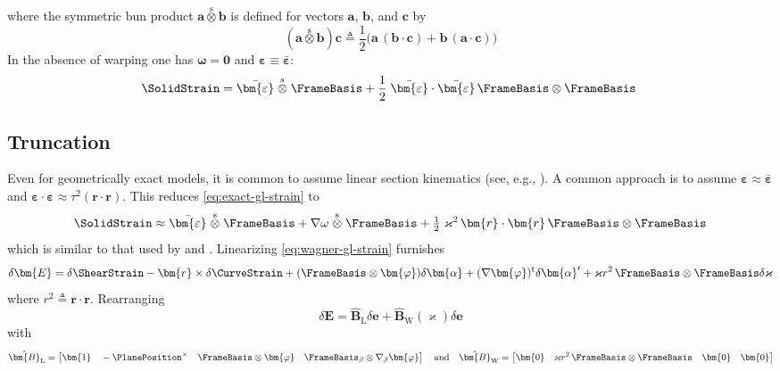 where the symmetric bun product \(\bm{a}\stackrel{\mathrm{s}}{\otimes}\bm{b}\) is defined for vectors \(\bm{a}\), \(\bm{b}\), and \(\bm{c}\) by
\begin{equation*}
    (\bm{a}\stackrel{\mathrm{s}}{\otimes}\bm{b} )\bm{c} \triangleq \frac{1}{2} \bigl(\bm{a}\,(\bm{b}\cdot\bm{c}) + \bm{b}\,(\bm{a}\cdot\bm{c})\bigr)
\end{equation*}
%
In the absence of warping one has $\bm{\omega}=\bm{0}$ and $\bm{\varepsilon}\equiv \bar{\bm{\varepsilon}}$:
$$
\SolidStrain = \bar{\bm{\varepsilon}}
\stackrel{\mathrm{s}}{\otimes}
\FrameBasis 
+ \frac{1}{2}\left.
\bar{\bm{\varepsilon}}\cdot\bar{\bm{\varepsilon}}\,\FrameBasis\otimes\FrameBasis\right. \\
$$

\subsection{Truncation}
Even for geometrically exact models, it is common to assume linear section kinematics (see, e.g., \cite{simo1991geometricallyexact}). A common approach is to assume \(\bm{\varepsilon} \approx \bar{\bm{\varepsilon}}\) and 
\(\bm{\varepsilon}\cdot\bm{\varepsilon} \approx
  \tau^2 (\bm{r}\cdot\bm{r})\). 
This reduces \cref{eq:exact-gl-strain} to
%
\begin{equation}
\SolidStrain \approx \bar{\bm{\varepsilon}}
\stackrel{\mathrm{s}}{\otimes}
\FrameBasis 
+\nabla\omega \stackrel{\mathrm{s}}{\otimes} \FrameBasis
+ \tfrac{1}{2}\left.\varkappa^2\,
\bm{r}\cdot\bm{r}\,\FrameBasis\otimes\FrameBasis
\right.
\label{eq:wagner-gl-strain}
\end{equation}
which is similar to that used by \cite{hsiao2000corotational,battini2002corotational,jonker2021threedimensional} and \cite{rong2020geometrically}. 
Linearizing \cref{eq:wagner-gl-strain} furnishes
\[
\delta \bm{E} = \delta \ShearStrain - \bm{r}\times\delta \CurveStrain + (\FrameBasis\otimes \bm{\varphi})\delta \bm{\alpha} + (\nabla \bm{\varphi})^{\mathrm{t}} \delta \bm{\alpha}' + \varkappa r^2\, \FrameBasis\otimes\FrameBasis\delta \varkappa 
\]
where \(r^2 \triangleq \bm{r}\cdot\bm{r}\). Rearranging
\begin{equation*}
    \delta \bm{E} = \hat{\bm{B}}_{\mathrm{L}}\delta \bm{e} +  \hat{\bm{B}}_{\mathrm{W}}(\varkappa) \delta \bm{e}
\end{equation*}
with
\begin{equation}
\hat{\bm{B}}_{\mathrm{L}}  = 
\left[\bm{1} 
~~~ -\PlanePosition^{\times}
~~~ \FrameBasis\otimes\bm{\varphi}
~~~ \FrameBasis_{\beta} \otimes \nabla_{\beta} \bm{\varphi}
\right]
\quad
\text{and}
\quad
\hat{\bm{B}}_{\mathrm{W}} = \left[\bm{0} 
~~~ \varkappa r^2\,\FrameBasis\otimes\FrameBasis  
~~~ \bm{0}
~~~ \bm{0}
\right]
\end{equation}
%
